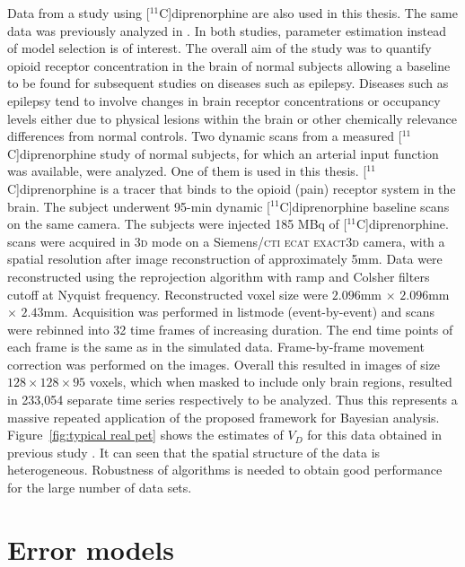 

Data from a \pet study using [$^{11}$C]diprenorphine are also used in this
thesis. The same data was previously analyzed in
\cite{Peng:2008fx,Jiang:2009kf}. In both studies, parameter estimation instead
of model selection is of interest. The overall aim of the study was to
quantify opioid receptor concentration in the brain of normal subjects
allowing a baseline to be found for subsequent studies on diseases such as
epilepsy. Diseases such as epilepsy tend to involve changes in brain receptor
concentrations or occupancy levels either due to physical lesions within the
brain or other chemically relevance differences from normal controls. Two
dynamic scans from a measured [$^{11}$C]diprenorphine study of normal
subjects, for which an arterial input function was available, were analyzed.
One of them is used in this thesis.  [$^{11}$C]diprenorphine is a tracer that
binds to the opioid (pain) receptor system in the brain. The subject underwent
95-min dynamic [$^{11}$C]diprenorphine \pet baseline scans on the same camera.
The subjects were injected 185 MBq of [$^{11}$C]diprenorphine. \pet scans were
acquired in \textsc{3d} mode on a Siemens/\textsc{cti ecat exact3d} \pet
camera, with a spatial resolution after image reconstruction of approximately
5{}mm. Data were reconstructed using the reprojection algorithm
\citep{Kinahan1989} with ramp and Colsher filters cutoff at Nyquist frequency.
Reconstructed voxel size were $2.096$mm $\times$ $2.096$mm $\times$ $2.43$mm.
Acquisition was performed in listmode (event-by-event) and scans were rebinned
into 32 time frames of increasing duration. The end time points of each frame
is the same as in the simulated data. Frame-by-frame movement correction was
performed on the \pet images. Overall this resulted in images of size
$128\times128\times95$ voxels, which when masked to include only brain
regions, resulted in 233,054 separate time series respectively to be analyzed.
Thus this represents a massive repeated application of the proposed framework
for Bayesian analysis.  Figure~\ref{fig:typical real pet} shows the estimates
of $V_D$ for this data obtained in previous study \cite{Zhou2013}. It can seen
that the spatial structure of the data is heterogeneous. Robustness of
algorithms is needed to obtain good performance for the large number of data
sets.

\section{Error models}
\label{sec:Error models}

